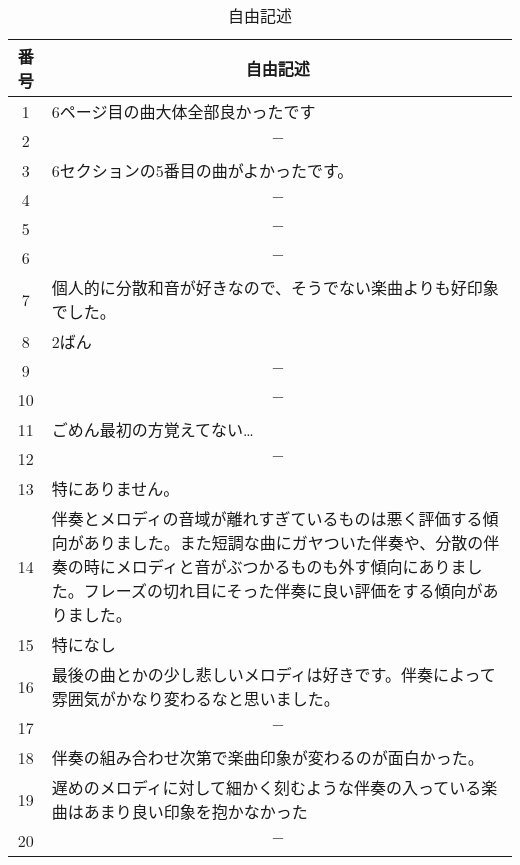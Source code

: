 \begin{table}[htb]
  \caption{自由記述}
  \label{tab:free}
  \centering
  \begin{tabular}{|c|p{130mm}|} \hline
      番号 & \multicolumn{1}{|c|}{自由記述} \\ \hline
      1 &  6ページ目の曲大体全部良かったです\\ \hline
      2 & \multicolumn{1}{|c|}{$-$} \\ \hline
      3 &  6セクションの5番目の曲がよかったです。\\ \hline
      4 &  \multicolumn{1}{|c|}{$-$} \\ \hline
      5 &  \multicolumn{1}{|c|}{$-$} \\ \hline
      6 &  \multicolumn{1}{|c|}{$-$} \\ \hline
      7 &  個人的に分散和音が好きなので、そうでない楽曲よりも好印象でした。\\ \hline
      8 &  2ばん\\ \hline
      9 &  \multicolumn{1}{|c|}{$-$}\\ \hline
      10 & \multicolumn{1}{|c|}{$-$}\\ \hline
      11 & ごめん最初の方覚えてない… \\ \hline
      12 & \multicolumn{1}{|c|}{$-$} \\ \hline
      13 & 特にありません。 \\ \hline
      14 & 伴奏とメロディの音域が離れすぎているものは悪く評価する傾向がありました。また短調な曲にガヤついた伴奏や、分散の伴奏の時にメロディと音がぶつかるものも外す傾向にありました。フレーズの切れ目にそった伴奏に良い評価をする傾向がありました。 \\ \hline
      15 & 特になし \\ \hline
      16 & 最後の曲とかの少し悲しいメロディは好きです。伴奏によって雰囲気がかなり変わるなと思いました。 \\ \hline
      17 & \multicolumn{1}{|c|}{$-$} \\ \hline
      18 & 伴奏の組み合わせ次第で楽曲印象が変わるのが面白かった。 \\ \hline
      19 & 遅めのメロディに対して細かく刻むような伴奏の入っている楽曲はあまり良い印象を抱かなかった \\ \hline
      20 & \multicolumn{1}{|c|}{$-$} \\ \hline
  \end{tabular}
\end{table}